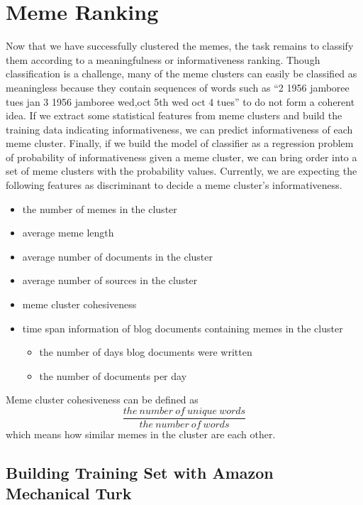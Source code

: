 \documentclass{sig-alternate}
\begin{document}
\section{Meme Ranking}
Now that we have successfully clustered the memes, the task remains to classify them according to a meaningfulness or informativeness ranking. Though classification is a challenge, many of the meme clusters can easily be classified as meaningless because they contain sequences of words such as “2 1956 jamboree tues jan 3 1956 jamboree wed,oct 5th wed oct 4 tues” to do not form a coherent idea. If we extract some statistical features from meme clusters and build the training data indicating informativeness, we can predict informativeness of each meme cluster. Finally, if we build the model of classifier as a regression problem of probability of informativeness given a meme cluster, we can bring order into a set of meme clusters with the probability values. Currently, we are expecting the following features as discriminant to decide a meme cluster's informativeness.
\begin{itemize}
 \item the number of memes in the cluster
 \item average meme length
 \item average number of documents in the cluster
 \item average number of sources in the cluster
 \item meme cluster cohesiveness
 \item time span information of blog documents containing memes in the cluster
  \begin{itemize}
    \item the number of days blog documents were written
    \item the number of documents per day
  \end{itemize}
\end{itemize}
Meme cluster cohesiveness can be defined as 
\begin{displaymath}
\frac{the\ number\ of\ unique\ words}{the\ number\ of\ words}
\end{displaymath}
which means how similar memes in the cluster are each other.

\subsection{Building Training Set with Amazon Mechanical Turk}
\end{document}
